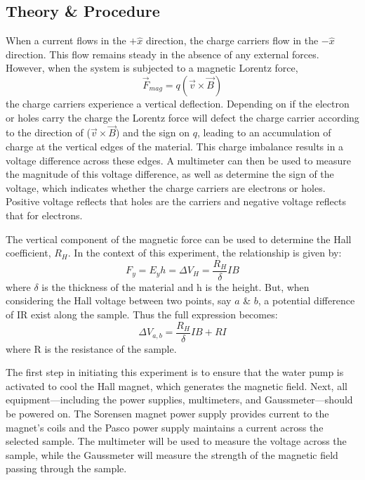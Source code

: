 \documentclass[a4paper,12pt,english]{all-in-one} %
\begin{document}
\begin{multicols}{2}

\section*{Theory \& Procedure}
{
When a current flows in the $+\hat{x}$  direction, the charge carriers flow in the $-\hat{x}$
direction. This flow remains steady in the absence of any external forces. However, when the system is subjected to a magnetic Lorentz force,
\begin{equation}
    \Vec{F}_{mag} = q(\Vec{v} \times \Vec{B})
\end{equation}
the charge carriers experience a vertical deflection. Depending on if the electron or holes carry the charge the Lorentz force will defect the charge carrier according to the direction of ($\Vec{v} \times \Vec{B}$) and the sign on $q$, leading to an accumulation of charge at the vertical edges of the material. This charge imbalance results in a voltage difference across these edges. A multimeter can then be used to measure the magnitude of this voltage difference, as well as determine the sign of the voltage, which indicates whether the charge carriers are electrons or holes. Positive voltage reflects that holes are the carriers and negative voltage reflects that for electrons. 

The vertical component of the magnetic force can be used to determine the Hall coefficient, $R_H$. In the context of this experiment, the relationship is given by:
\begin{equation}
    F_y = E_yh = \Delta V_H = \frac{R_H}{\delta}IB
\end{equation}
where $\delta$ is the thickness of the material and h is the height. But, when considering the Hall voltage between two points, say $a$ \& $b$, a potential difference of IR exist along the sample. Thus the full expression becomes:
\begin{equation}\label{eq:linear_hall}
    \Delta V_{a,b} = \frac{R_H}{\delta}IB + RI
\end{equation}
where R is the resistance of the sample.
 
The first step in initiating this experiment is to ensure that the water pump is activated to cool the Hall magnet, which generates the magnetic field. Next, all equipment—including the power supplies, multimeters, and Gaussmeter—should be powered on. The Sorensen magnet power supply provides current to the magnet's coils and the Pasco power supply maintains a current across the selected sample. The multimeter will be used to measure the voltage across the sample, while the Gaussmeter will measure the strength of the magnetic field passing through the sample.

}
\end{multicols}
\end{document}
